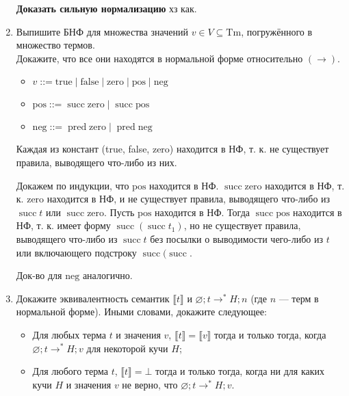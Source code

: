 \documentclass{article}
\DeclareMathOperator{\tsucc}{succ}
\DeclareMathOperator{\tpred}{pred}
\DeclareMathOperator{\colqq}{::=}
\begin{document}
\begin{enumerate}
        \textbf{Доказать сильную нормализацию} хз как.

    \item Выпишите БНФ для множества значений $v \in V \subseteq \mathrm{Tm}$, погружённого в множество термов.\\
    Докажите, что все они находятся в нормальной форме относительно $(\to)$.

        \begin{itemize}
            \item $v \colqq \mathrm{true} \mid \mathrm{false} \mid \mathrm{zero} \mid \mathrm{pos} \mid \mathrm{neg}$
            \item $\mathrm{pos} \colqq \tsucc\mathrm{zero} \mid \tsucc \mathrm{pos}$
            \item $\mathrm{neg} \colqq \tpred\mathrm{zero} \mid \tpred \mathrm{neg}$
        \end{itemize}    
    
        Каждая из констант (true, false, zero) находится в НФ, т. к. не существует правила, выводящего что-либо из них.
        
        Докажем по индукции, что $\mathrm{pos}$ находится в НФ. $\tsucc \mathrm{zero}$ находится в НФ, т. к. $\mathrm{zero}$ находится в НФ, и не существует правила, выводящего что-либо из $\tsucc t$ или $\tsucc \mathrm{zero}$. Пусть $\mathrm{pos}$ находится в НФ. Тогда $\tsucc \mathrm{pos}$ находится в НФ, т. к. имеет форму $\tsucc (\tsucc t_1)$, но не существует правила, выводящего что-либо из $\tsucc t$ без посылки о выводимости чего-либо из $t$ или включающего подстроку $\tsucc(\tsucc$. 

        Док-во для $\mathrm{neg}$ аналогично.

    \item Докажите эквивалентность семантик $\llbracket t\rrbracket$ и $\varnothing;t\to^* H;n$ (где $n$ --- терм в нормальной форме). Иными словами, докажите следующее:
    \begin{itemize}
        \item Для любых терма $t$ и значения $v$, $\llbracket t\rrbracket = \llbracket v\rrbracket$ тогда и только тогда, когда $\varnothing;t\to^* H;v$ для некоторой кучи $H$;
        \item Для любого терма $t$, $\llbracket t\rrbracket = \bot$ тогда и только тогда, когда ни для каких кучи $H$ и значения $v$ не верно, что $\varnothing;t\to^* H;v$.
    \end{itemize}
    

\end{enumerate}
\end{document}
